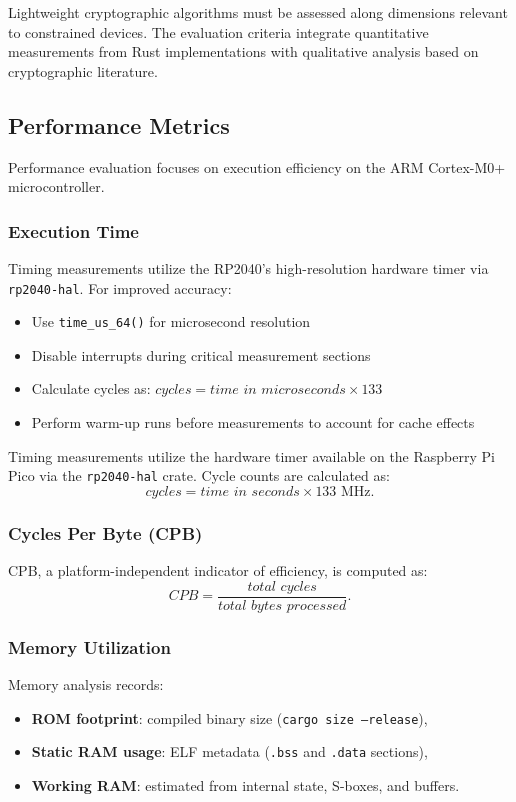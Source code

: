\documentclass[12pt]{report}
\begin{document}
Lightweight cryptographic algorithms must be assessed along dimensions relevant to constrained
devices. The evaluation criteria integrate quantitative measurements from Rust implementations
with qualitative analysis based on cryptographic literature.

\subsection{Performance Metrics}

Performance evaluation focuses on execution efficiency on the ARM Cortex-M0+ microcontroller.

\subsubsection*{Execution Time}

Timing measurements utilize the RP2040's high-resolution hardware timer via \texttt{rp2040-hal}.
For improved accuracy:
\begin{itemize}
    \item Use \texttt{time\_us\_64()} for microsecond resolution
    \item Disable interrupts during critical measurement sections
    \item Calculate cycles as: $\textit{cycles} = \textit{time in microseconds} \times 133$
    \item Perform warm-up runs before measurements to account for cache effects
\end{itemize}

Timing measurements utilize the hardware timer available on the Raspberry Pi Pico via the
\texttt{rp2040-hal} crate. Cycle counts are calculated as:
\[
    \textit{cycles} = \textit{time in seconds} \times 133\text{ MHz}.
\]

\subsubsection*{Cycles Per Byte (CPB)}

CPB, a platform-independent indicator of efficiency, is computed as:
\[
    \textit{CPB} = \frac{\textit{total cycles}}{\textit{total bytes processed}}.
\]

\subsubsection*{Memory Utilization}

Memory analysis records:
\begin{itemize}
    \item \textbf{ROM footprint}: compiled binary size (\texttt{cargo size --release}),
    \item \textbf{Static RAM usage}: ELF metadata (\texttt{.bss} and \texttt{.data} sections),
    \item \textbf{Working RAM}: estimated from internal state, S-boxes, and buffers.
\end{itemize}
\end{document}
